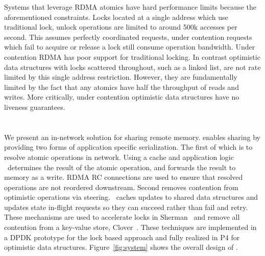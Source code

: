 Systems that leverage RDMA atomics have hard performance
limits because the aforementioned constraints.  Locks
located at a single address which use traditional lock,
unlock operations are limited to around 500k accesses per
second. This assumes perfectly coordinated requests, under
contention requests which fail to acquire or release a lock
still consume operation bandwidth.
Under contention RDMA has poor support for traditional
locking. In contrast optimistic data structures with locks
scattered throughout, such as a linked list, are not rate
limited by this single address restriction.  However, they
are fundamentally limited by the fact that any atomics have
half the throughput of reads and writes. More critically,
under contention optimistic data structures have no liveness
guarantees.





\section{\sword}

We present {\sword} an in-network solution for sharing
remote memory. {\sword} enables sharing by providing two
forms of application specific serialization. The first of
which is to resolve atomic operations in network. Using a
cache and application logic \sword\ determines the result of
the atomic operation, and forwards the result to memory as a
write. RDMA RC connections are used to ensure that resolved
operations are not reordered downstream.
%
Second {\sword} removes contention from optimistic
operations via steering. \sword\ caches updates to shared
data structures and updates state in-flight requests so they
can succeed rather than fail and retry.
These mechanisms are used to accelerate locks in
Sherman~\cite{sherman} and remove all contention from a
key-value store, Clover~\cite{clover}.
These techniques are implemented in a DPDK prototype for the
lock based approach and fully realized in P4 for optimistic
data structures. Figure~\ref{fig:system} shows the overall
design of {\sword}.

